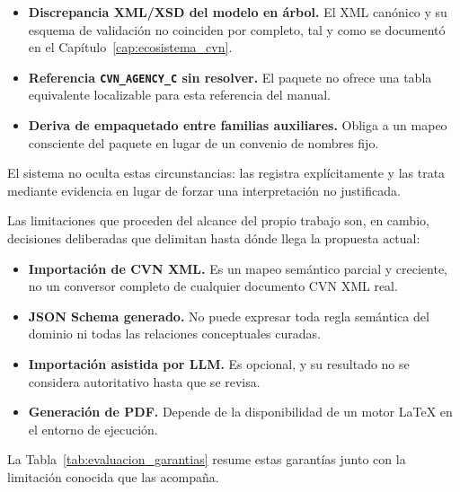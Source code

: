 \begin{itemize}
  \item \textbf{Discrepancia XML/XSD del modelo en árbol.} El XML canónico y
  su esquema de validación no coinciden por completo, tal y como se
  documentó en el Capítulo~\ref{cap:ecosistema_cvn}.

  \item \textbf{Referencia \texttt{CVN\_AGENCY\_C} sin resolver.} El paquete
  no ofrece una tabla equivalente localizable para esta referencia del
  manual.

  \item \textbf{Deriva de empaquetado entre familias auxiliares.} Obliga a
  un mapeo consciente del paquete en lugar de un convenio de nombres fijo.
\end{itemize}

El sistema no oculta estas circunstancias: las registra explícitamente y las
trata mediante evidencia en lugar de forzar una interpretación no
justificada.

Las limitaciones que proceden del alcance del propio trabajo son, en cambio,
decisiones deliberadas que delimitan hasta dónde llega la propuesta actual:

\begin{itemize}
  \item \textbf{Importación de CVN XML.} Es un mapeo semántico parcial y
  creciente, no un conversor completo de cualquier documento CVN XML real.

  \item \textbf{JSON Schema generado.} No puede expresar toda regla
  semántica del dominio ni todas las relaciones conceptuales curadas.

  \item \textbf{Importación asistida por LLM.} Es opcional, y su resultado
  no se considera autoritativo hasta que se revisa.

  \item \textbf{Generación de PDF.} Depende de la disponibilidad de un motor
  LaTeX en el entorno de ejecución.
\end{itemize}

La Tabla~\ref{tab:evaluacion_garantias} resume estas garantías junto con la
limitación conocida que las acompaña.


